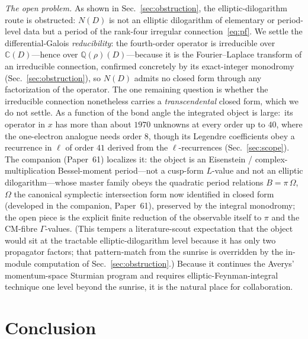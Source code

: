 \documentclass[aps,pra,twocolumn,superscriptaddress,longbibliography]{revtex4-2}
\begin{document}
\emph{The open problem.}  As shown in Sec.~\ref{sec:obstruction}, the
elliptic-dilogarithm route is obstructed: $N(D)$ is not an elliptic
dilogarithm of elementary or period-level data but a period of the rank-four
irregular connection~\eqref{eq:pf}.  We settle the differential-Galois
\emph{reducibility}: the fourth-order operator is irreducible over
$\mathbb{C}(D)$---hence over $\mathbb{Q}(\rho)(D)$---because it is the
Fourier--Laplace transform of an irreducible connection, confirmed concretely by
its exact-integer monodromy (Sec.~\ref{sec:obstruction}), so $N(D)$ admits no
closed form through any factorization of the operator.  The
one remaining question is whether the irreducible connection nonetheless carries
a \emph{transcendental} closed form, which we do not settle.  As a function of the
bond angle the integrated object is large:\ its operator in $x$ has more than about $1970$
unknowns at every order up to $40$, where the one-electron analogue needs order $8$,
though its Legendre coefficients obey a recurrence in $\ell$ of order $41$ derived from the
$\ell$-recurrences (Sec.~\ref{sec:scope}).
The companion (Paper~61) localizes it: the object is an Eisenstein /
complex-multiplication Bessel-moment period---not a cusp-form $L$-value and not an
elliptic dilogarithm---whose master family obeys the quadratic period relations
$B=\pi\,\Omega$, $\Omega$ the canonical symplectic intersection form now identified in
closed form (developed in the companion, Paper~61), preserved by the integral monodromy; the
open piece is the explicit finite reduction of the observable itself to $\pi$ and the
CM-fibre $\Gamma$-values.
(This tempers a literature-scout expectation that the object would sit at the
tractable elliptic-dilogarithm level because it has only two propagator
factors; that pattern-match from the sunrise is overridden by the in-module
computation of Sec.~\ref{sec:obstruction}.)  Because it continues the Averys'
momentum-space Sturmian program and requires elliptic-Feynman-integral
technique one level beyond the sunrise, it is the natural place for
collaboration.

\section{Conclusion}
\end{document}
